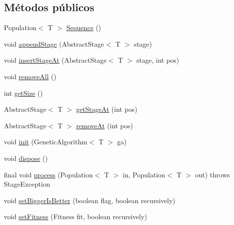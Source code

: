 \subsection*{Métodos públicos}
\begin{DoxyCompactItemize}
\item 
Population$<$ T $>$ \hyperlink{classjenes_1_1stage_1_1_sequence_3_01_t_01extends_01_chromosome_01_4_a8d41af628fe9c1e2fdf4be3c9938a172}{Sequence} ()
\item 
void \hyperlink{classjenes_1_1stage_1_1_sequence_3_01_t_01extends_01_chromosome_01_4_a7d0e59aeed366cb6f71f754f61bfceb3}{append\-Stage} (Abstract\-Stage$<$ T $>$ stage)
\item 
void \hyperlink{classjenes_1_1stage_1_1_sequence_3_01_t_01extends_01_chromosome_01_4_a922e6363fc19620738e95ddfc649ea6e}{insert\-Stage\-At} (Abstract\-Stage$<$ T $>$ stage, int pos)
\item 
void \hyperlink{classjenes_1_1stage_1_1_sequence_3_01_t_01extends_01_chromosome_01_4_ab020311ac8fad8d6d884df9634c211b8}{remove\-All} ()
\item 
int \hyperlink{classjenes_1_1stage_1_1_sequence_3_01_t_01extends_01_chromosome_01_4_af16f419e9be758779fa14cf53f31bfe1}{get\-Size} ()
\item 
Abstract\-Stage$<$ T $>$ \hyperlink{classjenes_1_1stage_1_1_sequence_3_01_t_01extends_01_chromosome_01_4_aa9e1d97737fed4c5141cda315c216b32}{get\-Stage\-At} (int pos)
\item 
Abstract\-Stage$<$ T $>$ \hyperlink{classjenes_1_1stage_1_1_sequence_3_01_t_01extends_01_chromosome_01_4_a1336b162d37aaa9b402c49480d12f8ef}{remove\-At} (int pos)
\item 
void \hyperlink{classjenes_1_1stage_1_1_sequence_3_01_t_01extends_01_chromosome_01_4_a98d9ad6e0fdc1547971fe7fce029e25f}{init} (Genetic\-Algorithm$<$ T $>$ ga)
\item 
void \hyperlink{classjenes_1_1stage_1_1_sequence_3_01_t_01extends_01_chromosome_01_4_a4faf3479fa76eef530633ce8339971e5}{dispose} ()
\item 
final void \hyperlink{classjenes_1_1stage_1_1_sequence_3_01_t_01extends_01_chromosome_01_4_adc0e7397edd44839ef221122db3696e8}{process} (Population$<$ T $>$ in, Population$<$ T $>$ out)  throws Stage\-Exception 
\item 
void \hyperlink{classjenes_1_1stage_1_1_sequence_3_01_t_01extends_01_chromosome_01_4_a759a03c3336352cc390b2024afcc2ab1}{set\-Bigger\-Is\-Better} (boolean flag, boolean recursively)
\item 
void \hyperlink{classjenes_1_1stage_1_1_sequence_3_01_t_01extends_01_chromosome_01_4_a1ec43e74c2534861caf2475405869853}{set\-Fitness} (Fitness fit, boolean recursively)
\end{DoxyCompactItemize}


